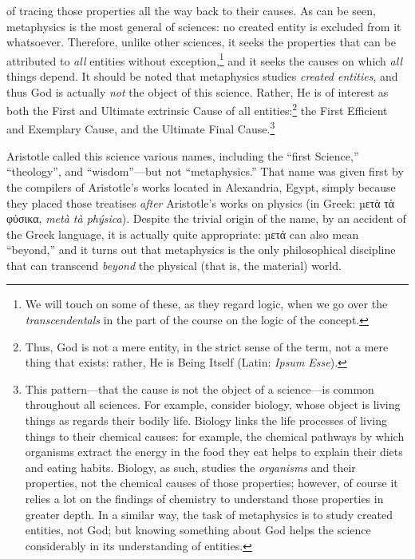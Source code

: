 \documentclass[article,12pt,a4paper,oneside]{memoir}
\begin{document}
    of tracing those properties all the way back to their causes. As can
    be seen, metaphysics is the most general of sciences: no created
    entity is excluded from it whatsoever. Therefore, unlike other
    sciences, it seeks the properties that can be attributed to
    \emph{all} entities without exception,\footnote{We will touch on
      some of these, as they regard logic, when we go over the
      \emph{transcendentals} in the part of the course on the logic of
      the concept.} and it seeks the causes on which \emph{all} things
    depend. It should be noted that metaphysics studies \emph{created
    entities}, and thus God is actually \emph{not} the object of this
    science. Rather, He is of interest as both the First and Ultimate
    extrinsic Cause of all entities:\footnote{Thus, God is not a mere
      entity, in the strict sense of the term, not a mere thing that
      exists: rather, He is Being Itself (Latin: \emph{Ipsum Esse}).}
    the First Efficient and Exemplary Cause, and the Ultimate Final
    Cause.\footnote{This pattern---that the cause is not the object of a
      science---is common throughout all sciences. For example, consider
      biology, whose object is living things as regards their bodily
      life. Biology links the life processes of living things to their
      chemical causes: for example, the chemical pathways by which
      organisms extract the energy in the food they eat helps to explain
      their diets and eating habits. Biology, as such, studies the
      \emph{organisms} and their properties, not the chemical causes of
      those properties; however, of course it relies a lot on the
      findings of chemistry to understand those properties in greater
      depth. In a similar way, the task of metaphysics is to study
      created entities, not God; but knowing something about God helps
      the science considerably in its understanding of entities.}

    Aristotle called this science various names, including the ``first
    Science,'' ``theology'', and ``wisdom''---but not ``metaphysics.''
    That name was given first by the compilers of Aristotle's works
    located in Alexandria, Egypt, simply because they placed those
    treatises \emph{after} Aristotle's works on physics (in Greek: µετὰ
    τὰ φύσικα, \emph{metà tà phýsica}). Despite the trivial origin of
    the name, by an accident of the Greek language, it is actually quite
    appropriate: µετά can also mean ``beyond,'' and it turns out that
    metaphysics is the only philosophical discipline that can transcend
    \emph{beyond} the physical (that is, the material) world.
\end{document}
